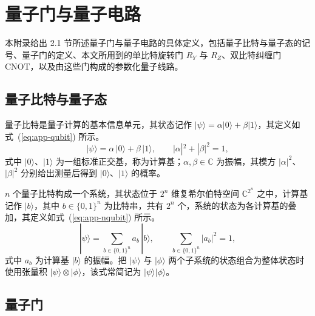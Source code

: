 
\section{量子门与量子电路}\label{app:quantum}

本附录给出 2.1 节所述量子门与量子电路的具体定义，包括量子比特与量子态的记号、量子门的定义、本文所用到的单比特旋转门 $R_Y$ 与 $R_Z$、双比特纠缠门 CNOT，以及由这些门构成的参数化量子线路。

\subsection{量子比特与量子态}

量子比特是量子计算的基本信息单元，其状态记作 $|\psi\rangle = \alpha|0\rangle + \beta|1\rangle$，其定义如式~(\ref{eq:app-qubit}) 所示。
\begin{equation}
\label{eq:app-qubit}
|\psi\rangle = \alpha\,|0\rangle + \beta\,|1\rangle,\qquad |\alpha|^2+|\beta|^2=1,
\end{equation}
式中 $|0\rangle$、$|1\rangle$ 为一组标准正交基，称为计算基；$\alpha,\beta\in\mathbb{C}$ 为振幅，其模方 $|\alpha|^2$、$|\beta|^2$ 分别给出测量后得到 $|0\rangle$、$|1\rangle$ 的概率。

$n$ 个量子比特构成一个系统，其状态位于 $2^n$ 维复希尔伯特空间 $\mathbb{C}^{2^n}$ 之中，计算基记作 $|b\rangle$，其中 $b\in\{0,1\}^n$ 为比特串，共有 $2^n$ 个，系统的状态为各计算基的叠加，其定义如式~(\ref{eq:app-nqubit}) 所示。
\begin{equation}
\label{eq:app-nqubit}
|\psi\rangle = \sum_{b\in\{0,1\}^n} a_b\,|b\rangle,\qquad \sum_{b\in\{0,1\}^n}|a_b|^2 = 1,
\end{equation}
式中 $a_b$ 为计算基 $|b\rangle$ 的振幅。把 $|\psi\rangle$ 与 $|\phi\rangle$ 两个子系统的状态组合为整体状态时使用张量积 $|\psi\rangle\otimes|\phi\rangle$，该式常简记为 $|\psi\rangle|\phi\rangle$。

\subsection{量子门}

